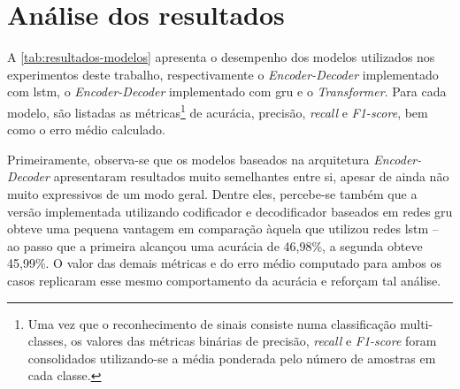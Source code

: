 \section{Análise dos resultados}
\label{sec:avaliacao-resultados}

A \autoref{tab:resultados-modelos} apresenta o desempenho dos modelos utilizados nos experimentos deste trabalho, respectivamente o \textit{Encoder-Decoder} implementado com \acrshort{lstm}, o \textit{Encoder-Decoder} implementado com \acrshort{gru} e o \textit{Transformer}.
Para cada modelo, são listadas as métricas\footnote{
    Uma vez que o reconhecimento de sinais consiste numa classificação multi-classes, os valores das métricas binárias de precisão, \textit{recall} e \textit{F1-score} foram consolidados utilizando-se a média ponderada pelo número de amostras em cada classe.
} de acurácia, precisão, \textit{recall} e \textit{F1-score}, bem como o erro médio calculado.





Primeiramente, observa-se que os modelos baseados na arquitetura \textit{Encoder-Decoder} apresentaram resultados muito semelhantes entre si, apesar de ainda não muito expressivos de um modo geral.
Dentre eles, percebe-se também que a versão implementada utilizando codificador e decodificador baseados em redes \acrshort{gru} obteve uma pequena vantagem em comparação àquela que utilizou redes \acrshort{lstm} -- ao passo que a primeira alcançou uma acurácia de 46,98\%, a segunda obteve 45,99\%.
O valor das demais métricas e do erro médio computado para ambos os casos replicaram esse mesmo comportamento da acurácia e reforçam tal análise.

